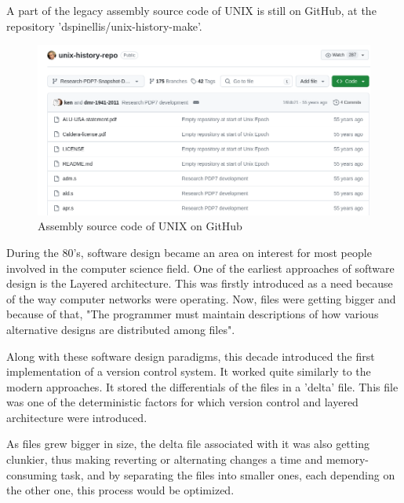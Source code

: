 A part of the legacy assembly source code of UNIX is still on GitHub, at the repository 'dspinellis/unix-history-make'.
\begin{figure}[htbp]
    \centering
    \includegraphics[scale=0.5]{pictures/unix_repo.png}
    \caption{Assembly source code of UNIX on GitHub}
    \label{unixRepo}
\end{figure}
During the 80's, software design became an area on interest for most people involved in the computer science field.
One of the earliest approaches of software design is the Layered architecture.
This was firstly introduced as a need because of the way computer networks were operating.
Now, files were getting bigger and because of that, "The programmer must maintain descriptions of
how various alternative designs are distributed among files"\cite{layeredArchitecure80s}.

\par

Along with these software design paradigms, this decade introduced the first implementation of a version control system.
It worked quite similarly to the modern approaches.
It stored the differentials of the files in a 'delta' file\cite{layeredArchitecure80s}.
This file was one of the deterministic factors for which version control and layered architecture were introduced.

As files grew bigger in size, the delta file associated with it was also getting clunkier, thus making reverting or alternating changes a time and memory-consuming task, and by separating the files into smaller ones, each depending on the other one, this process would be optimized.

